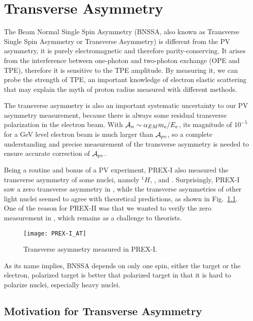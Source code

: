 \chapter{Transverse Asymmetry}
The Beam Normal Single Spin Asymmetry (BNSSA, also known as Transverse Single Spin Asymmetry
or Transverse Asymmetry) is different from the PV asymmetry, it is purely 
electromagnetic and therefore parity-conserving. It arises from the interference
between one-photon and two-photon exchange (OPE and TPE), therefore it is sensitive 
to the TPE amplitude. By measuring it, we can probe the strength of TPE, an 
important knowledge of electron elastic scattering that may explain the myth
of proton radius measured with different methods.

The transverse asymmetry is also an important systematic uncertainty to our PV 
asymmetry measurement, because there is always some residual transverse polarization
in the electron beam. With $\mathcal{A}_n \sim \alpha_{EM}m_e/E_e$, its magnitude of $10^{-5}$
for a GeV level electron beam is much larger than $\mathcal{A}_{pv}$, so a complete 
understanding and precise measurement of the transverse asymmetry is needed
to ensure accurate correction of $\mathcal{A}_{pv}$.

Being a routine and bonus of a PV experiment, PREX-I also measured the transverse
asymmetry of some nuclei, namely ${}^{1}H$, \He, \C and \Pb. Surprisingly, PREX-I
saw a zero transverse asymmetry in \Pb, while the transverse asymmetries of other 
light nuclei seemed to agree with theoretical predictions, as shown in 
Fig.~\ref{fig:PREX-I_AT}. One of the reason for PREX-II was that we wanted to
verify the zero measurement in \Pb, which remains as a challenge to theorists.
\begin{figure}
    \centering
    \texttt{[image: PREX-I\_AT]}
    \caption{Transverse asymmetry measured in PREX-I.}
    \label{fig:PREX-I_AT}
\end{figure}

As its name implies, BNSSA depends on only one spin, either the target or the
electron, polarized target is better that polarized target in that it is hard
to polarize nuclei, especially heavy nuclei.

\section{Motivation for Transverse Asymmetry}

